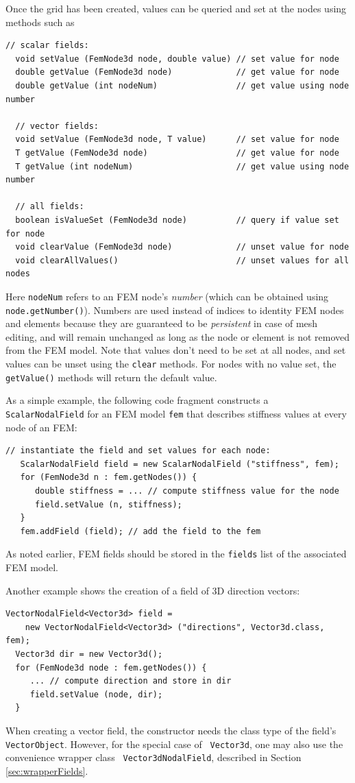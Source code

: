 Once the grid has been created, values can be queried and set at the
nodes using methods such as
%
\begin{lstlisting}[]
  // scalar fields:
  void setValue (FemNode3d node, double value) // set value for node
  double getValue (FemNode3d node)             // get value for node
  double getValue (int nodeNum)                // get value using node number

  // vector fields:
  void setValue (FemNode3d node, T value)      // set value for node
  T getValue (FemNode3d node)                  // get value for node
  T getValue (int nodeNum)                     // get value using node number

  // all fields:
  boolean isValueSet (FemNode3d node)          // query if value set for node
  void clearValue (FemNode3d node)             // unset value for node
  void clearAllValues()                        // unset values for all nodes
\end{lstlisting}
%
Here {\tt nodeNum} refers to an FEM node's {\it number} (which can be
obtained using {\tt node.getNumber()}). Numbers are used instead of
indices to identity FEM nodes and elements because they are guaranteed
to be {\it persistent} in case of mesh editing, and will remain
unchanged as long as the node or element is not removed from the FEM
model. Note that values don't need to be set at all nodes, and set
values can be unset using the {\tt clear} methods. For nodes with no
value set, the {\tt getValue()} methods will return the default value.

As a simple example, the following code fragment constructs a {\tt
ScalarNodalField} for an FEM model {\tt fem} that describes stiffness
values at every node of an FEM:
%
\begin{lstlisting}[]
   // instantiate the field and set values for each node:
   ScalarNodalField field = new ScalarNodalField ("stiffness", fem);
   for (FemNode3d n : fem.getNodes()) {
      double stiffness = ... // compute stiffness value for the node
      field.setValue (n, stiffness);
   }
   fem.addField (field); // add the field to the fem
\end{lstlisting}
%
As noted earlier, FEM fields should be stored in the {\tt fields} list
of the associated FEM model.

Another example shows the creation of a field of 3D direction vectors:
%
\begin{lstlisting}[]
  VectorNodalField<Vector3d> field =
    new VectorNodalField<Vector3d> ("directions", Vector3d.class, fem);
  Vector3d dir = new Vector3d();
  for (FemNode3d node : fem.getNodes()) {
     ... // compute direction and store in dir
     field.setValue (node, dir);
  }
\end{lstlisting}
%
When creating a vector field, the constructor needs the class type of
the field's {\tt VectorObject}. However, for the special case of {\tt
Vector3d}, one may also use the convenience wrapper class {\tt
Vector3dNodalField}, described in Section \ref{sec:wrapperFields}.


